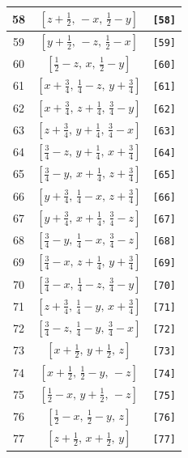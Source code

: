 \documentclass[fleqn,8pt]{jsarticle}
\begin{document}
\begin{longtable}{ccc}
58 & $\left[ z + \frac{1}{2},\, - x,\, \frac{1}{2} - y \right]$ & {\tt [58]} \\ \hline
59 & $\left[ y + \frac{1}{2},\, - z,\, \frac{1}{2} - x \right]$ & {\tt [59]} \\ \hline
60 & $\left[ \frac{1}{2} - z,\, x,\, \frac{1}{2} - y \right]$ & {\tt [60]} \\ \hline
61 & $\left[ x + \frac{3}{4},\, \frac{1}{4} - z,\, y + \frac{3}{4} \right]$ & {\tt [61]} \\ \hline
62 & $\left[ x + \frac{3}{4},\, z + \frac{1}{4},\, \frac{3}{4} - y \right]$ & {\tt [62]} \\ \hline
63 & $\left[ z + \frac{3}{4},\, y + \frac{1}{4},\, \frac{3}{4} - x \right]$ & {\tt [63]} \\ \hline
64 & $\left[ \frac{3}{4} - z,\, y + \frac{1}{4},\, x + \frac{3}{4} \right]$ & {\tt [64]} \\ \hline
65 & $\left[ \frac{3}{4} - y,\, x + \frac{1}{4},\, z + \frac{3}{4} \right]$ & {\tt [65]} \\ \hline
66 & $\left[ y + \frac{3}{4},\, \frac{1}{4} - x,\, z + \frac{3}{4} \right]$ & {\tt [66]} \\ \hline
67 & $\left[ y + \frac{3}{4},\, x + \frac{1}{4},\, \frac{3}{4} - z \right]$ & {\tt [67]} \\ \hline
68 & $\left[ \frac{3}{4} - y,\, \frac{1}{4} - x,\, \frac{3}{4} - z \right]$ & {\tt [68]} \\ \hline
69 & $\left[ \frac{3}{4} - x,\, z + \frac{1}{4},\, y + \frac{3}{4} \right]$ & {\tt [69]} \\ \hline
70 & $\left[ \frac{3}{4} - x,\, \frac{1}{4} - z,\, \frac{3}{4} - y \right]$ & {\tt [70]} \\ \hline
71 & $\left[ z + \frac{3}{4},\, \frac{1}{4} - y,\, x + \frac{3}{4} \right]$ & {\tt [71]} \\ \hline
72 & $\left[ \frac{3}{4} - z,\, \frac{1}{4} - y,\, \frac{3}{4} - x \right]$ & {\tt [72]} \\ \hline
73 & $\left[ x + \frac{1}{2},\, y + \frac{1}{2},\, z \right]$ & {\tt [73]} \\ \hline
74 & $\left[ x + \frac{1}{2},\, \frac{1}{2} - y,\, - z \right]$ & {\tt [74]} \\ \hline
75 & $\left[ \frac{1}{2} - x,\, y + \frac{1}{2},\, - z \right]$ & {\tt [75]} \\ \hline
76 & $\left[ \frac{1}{2} - x,\, \frac{1}{2} - y,\, z \right]$ & {\tt [76]} \\ \hline
77 & $\left[ z + \frac{1}{2},\, x + \frac{1}{2},\, y \right]$ & {\tt [77]} \\ \hline

\end{longtable}
\end{document}
